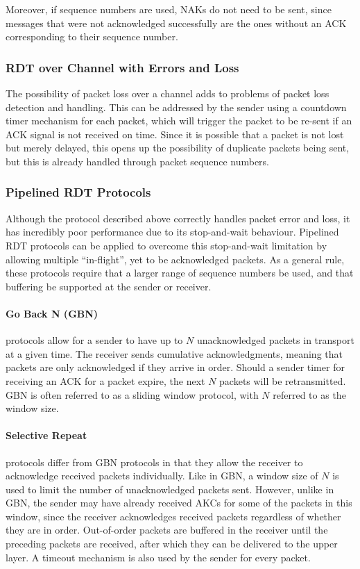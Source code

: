\documentclass[12pt,titlepage]{article}
\begin{document}
        Moreover, if sequence numbers are used, NAKs do not need to be sent, since messages that were not acknowledged successfully are the ones without an ACK corresponding to their
        sequence number.

      \subsubsection{RDT over Channel with Errors and Loss}
        The possibility of packet loss over a channel adds to problems of packet loss detection and handling. This can be addressed by the sender using a countdown timer mechanism for each
        packet, which will trigger the packet to be re-sent if an ACK signal is not received on time. Since it is possible that a packet is not lost but merely delayed, this opens up the
        possibility of duplicate packets being sent, but this is already handled through packet sequence numbers.

      \subsubsection{Pipelined RDT Protocols}
        Although the protocol described above correctly handles packet error and loss, it has incredibly poor performance due to its stop-and-wait behaviour. Pipelined RDT protocols can
        be applied to overcome this stop-and-wait limitation by allowing multiple ``in-flight'', yet to be acknowledged packets. As a general rule, these protocols require that a larger
        range of sequence numbers be used, and that buffering be supported at the sender or receiver.

        \paragraph{Go Back N (GBN)} protocols allow for a sender to have up to $N$ unacknowledged packets in transport at a given time. The receiver sends cumulative acknowledgments,
        meaning that packets are only acknowledged if they arrive in order. Should a sender timer for receiving an ACK for a packet expire, the next $N$ packets will be retransmitted.
        GBN is often referred to as a sliding window protocol, with $N$ referred to as the window size.

        \paragraph{Selective Repeat} protocols differ from GBN protocols in that they allow the receiver to acknowledge received packets individually. Like in GBN, a window size of $N$
        is used to limit the number of unacknowledged packets sent. However, unlike in GBN, the sender may have already received AKCs for some of the packets in this window, since the
        receiver acknowledges received packets regardless of whether they are in order. Out-of-order packets are buffered in the receiver until the preceding packets are received, after
        which they can be delivered to the upper layer. A timeout mechanism is also used by the sender for every packet.
\end{document}
